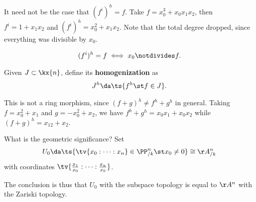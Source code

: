 \begin{example}[?]

It need not be the case that \((f^i)^h = f\). Take
\(f = x_0^3 + x_0 x_1 x_2\), then \(f^i = 1 + x_1 x_2\) and
\((f^i)^h = x_0^2 + x_1 x_2\). Note that the total degree dropped, since
everything was divisible by \(x_0\).

\end{example}

\begin{remark}

\begin{align*}  
(f^i)^h = f \iff x_0 \notdivides f
.\end{align*}

\end{remark}

\begin{definition}

Given \(J\subset \kx{n}\), define its \textbf{homogenization} as
\begin{align*}  
J^h \da \ts{f^h \st f\in J}
.\end{align*}

\end{definition}

\begin{example}

This is not a ring morphism, since \((f+g)^h \neq f^h + g^h\) in
general. Taking \(f = x_0^2 + x_1\) and \(g= -x_0^2 + x_2\), we have
\(f^h + g^h = x_0 x_1 + x_0 x_2\) while \((f+g)^h = x_12 + x_2\).

\end{example}

\begin{remark}

What is the geometric significance? Set
\begin{align*}
U_0 \da \ts{\tv{x_0: \cdots :x_n} \in \PP^n_{/k} \st x_0 \neq 0 } \cong \AA^n_{/k}
\end{align*} with coordinates
\(\tv{{x_1\over x_0} : \cdots : {x_n \over x_0}}\).

\end{remark}

\begin{proposition}[?]

The conclusion is thus that \(U_0\) with the subspace topology is equal
to \(\AA^n\) with the Zariski topology.

\end{proposition}

